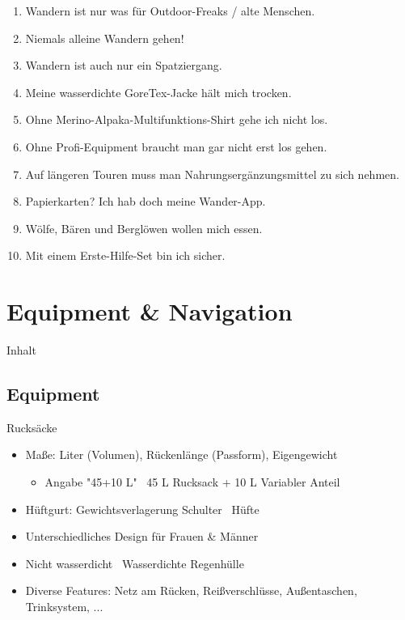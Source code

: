 \documentclass{beamer}
\begin{document}
			\begin{frame}{}
				\begin{enumerate}
					\item Wandern ist nur was für Outdoor-Freaks / alte Menschen.\pause
					\item Niemals alleine Wandern gehen!\pause
					\item Wandern ist auch nur ein Spatziergang.\pause
					\item Meine wasserdichte GoreTex-Jacke hält mich trocken.\pause
					\item Ohne Merino-Alpaka-Multifunktions-Shirt gehe ich nicht los.\pause
					\item Ohne Profi-Equipment braucht man gar nicht erst los gehen.\pause
					\item Auf längeren Touren muss man Nahrungsergänzungsmittel zu sich nehmen.\pause
					\item Papierkarten? Ich hab doch meine Wander-App.\pause
					\item Wölfe, Bären und Berglöwen wollen mich essen.\pause
					\item Mit einem Erste-Hilfe-Set bin ich sicher.\pause
				\end{enumerate}
			\end{frame}
			
	\section{Equipment \& Navigation}
		
		\begin{frame}[t]{Inhalt}
		\end{frame}
		
		\subsection{Equipment}
		
			\begin{frame}{Rucksäcke}
				\begin{itemize}
					\item Maße: Liter (Volumen), Rückenlänge (Passform), Eigengewicht
					\begin{itemize}
						\item Angabe "45+10 L" \textrightarrow\ 45 L Rucksack + 10 L Variabler Anteil
					\end{itemize}\pause
					\item Hüftgurt: Gewichtsverlagerung Schulter \textrightarrow\ Hüfte\pause
					\item Unterschiedliches Design für Frauen \& Männer\pause
					\item Nicht wasserdicht \textrightarrow\ Wasserdichte Regenhülle\pause
					\item Diverse Features: Netz am Rücken, Reißverschlüsse, Außentaschen, Trinksystem, ...
				\end{itemize}
			\end{frame}
			
\end{document}
